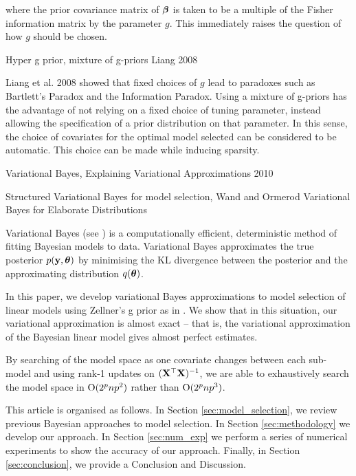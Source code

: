 \documentclass{amsart}[12pt]
\begin{document}
where the prior covariance matrix of ${\boldsymbol \beta}$ is taken to be a multiple of the Fisher information 
matrix by the parameter $g$. This immediately raises the question of how $g$ should be chosen.

Hyper g prior, mixture of g-priors Liang 2008

Liang et al. 2008 showed that fixed choices of $g$ lead to paradoxes such as Bartlett's Paradox and
the Information Paradox.
Using a mixture of g-priors has the advantage of not relying on a fixed choice of tuning
parameter, instead allowing the specification of a prior distribution on that parameter. In this sense, the 
choice of covariates for the optimal model selected can be considered to be automatic. This choice can be
made while inducing sparsity.


Variational Bayes, Explaining Variational Approximations 2010

Structured Variational Bayes for model selection, Wand and Ormerod Variational Bayes for Elaborate 
Distributions


Variational Bayes (see \cite{Ormerod2010}) is a computationally efficient, deterministic method of fitting
Bayesian models to data. Variational Bayes approximates the true posterior $p({\bf y}, {\boldsymbol \theta})$ by minimising the
KL divergence between the posterior and the  approximating distribution $q({\boldsymbol \theta})$.



In this paper, we develop variational Bayes approximations to model selection of linear models using
Zellner's g prior as in \cite{Liang2008}. We show that in this situation, our variational approximation
is almost exact -- that is, the variational approximation of the Bayesian linear model gives almost perfect
estimates.

By searching of the model space as one covariate changes between each sub-model and  using rank-1 updates on
$({\bf X}^\top {\bf X})^{-1}$, we are able to exhaustively search the model space in $\text{O}(2^p np^2)$ rather than
$\text{O}(2^p np^3)$.

This article is organised as follows. In Section \ref{sec:model_selection}, we review previous Bayesian
approaches to model selection. In Section \ref{sec:methodology} we develop our approach. In Section
\ref{sec:num_exp} we perform a series of numerical experiments to show the accuracy of our approach. Finally,
in Section \ref{sec:conclusion}, we provide a Conclusion and Discussion.
\end{document}
